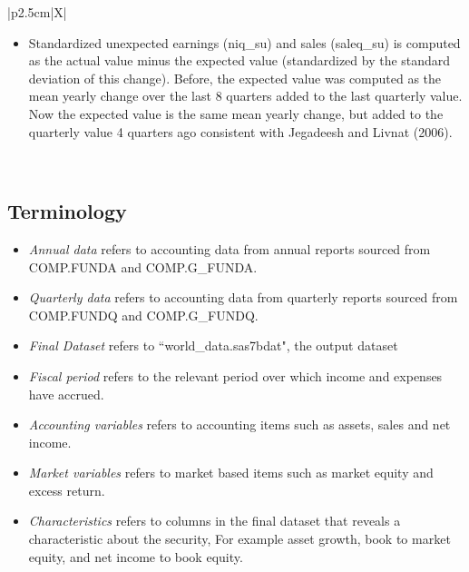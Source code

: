 \documentclass[12pt,title,fleqn]{article}
\begin{document}
\begin{xltabular}{\textwidth}{|p{2.5cm}|X|}
\begin{itemize}[nosep, leftmargin=*]
    \item Standardized unexpected earnings (niq\_su) and sales (saleq\_su) is computed as the actual value minus the expected value (standardized by the standard deviation of this change). Before, the expected value was computed as the mean yearly change over the last 8 quarters added to the last quarterly value. Now the expected value is the same mean yearly change, but added to the quarterly value 4 quarters ago consistent with Jegadeesh and Livnat (2006).
\end{itemize} \\
\hline
\end{xltabular}


\subsection{Terminology}
\begin{itemize}
	\item \textit{Annual data} refers to accounting data from annual reports sourced from COMP.FUNDA and COMP.G\_FUNDA.
	
	\item \textit{Quarterly data} refers to accounting data from quarterly reports sourced from COMP.FUNDQ and COMP.G\_FUNDQ.
	
	\item \textit{Final Dataset} refers to ``world\_data.sas7bdat", the output dataset
	
	\item \textit{Fiscal period} refers to the relevant period over which income and expenses have accrued. 
	
	\item \textit{Accounting variables} refers to accounting items such as assets, sales and net income. 
	
	\item \textit{Market variables} refers to market based items such as market equity and excess return.
	
	\item \textit{Characteristics} refers to columns in the final dataset that reveals a characteristic about the security, For example asset growth, book to market equity, and net income to book equity. 
\end{itemize}
\end{document}
